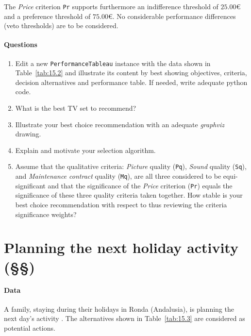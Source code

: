 The \emph{Price} criterion \texttt{Pr} supports furthermore an indifference threshold of $25.00$€ and a preference threshold of $75.00$€. No considerable performance differences (veto thresholds) are to be considered.

\paragraph{\textbf{Questions}}

\begin{enumerate}
\item Edit a new \texttt{PerformanceTableau} instance with the data shown in Table~\vref{tab:15.2} and illustrate its content by best showing objectives, criteria, decision alternatives and performance table. If needed, write adequate python code.
\item What is the best TV set to recommend?
\item Illustrate your best choice recommendation with an adequate \emph{graphviz} drawing.
\item Explain and motivate your selection algorithm.
\item Assume that the qualitative criteria: \emph{Picture} quality (\texttt{Pq}), \emph{Sound} quality (\texttt{Sq}), and \emph{Maintenance contract} quality (\texttt{Mq}), are all three considered to be equi-significant and that the significance of the \emph{Price} criterion (\texttt{Pr}) equals the significance of these three quality criteria taken together. How stable is your best choice recommendation with respect to thus reviewing the criteria significance weights?
\end{enumerate}   

\section{Planning the next holiday activity  (§§)}
\label{sec:15.4}

\paragraph{\textbf{Data}}

\noindent A family, staying during their holidays in Ronda (Andalusia), is planning the next day’s activity \citep{BIS-2008b}. The alternatives shown in Table~\vref{tab:15.3} are considered as potential actions.


